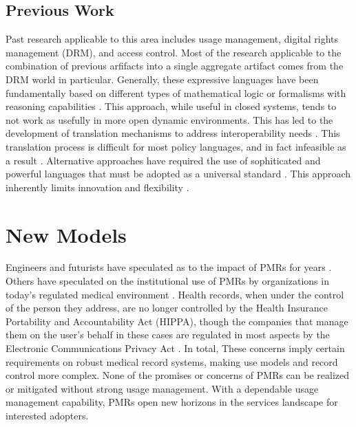 \documentclass[10pt, conference, compsocconf]{IEEEtran}
\begin{document}
\subsection{Previous Work}
Past research applicable to this area includes usage management, digital rights management (DRM), and access control.  Most of the research applicable to the combination of previous arfifacts into a single aggregate artifact comes from the DRM world in particular.  Generally, these expressive languages have been fundamentally based on different types of mathematical logic or formalisms with reasoning capabilities \cite{ArHu:07,BaMi:06,ChCoEtHaJoLa:03,HaWe:04,HaWe:08,PuWe:02,XiBjFu:08}.  This approach, while useful in closed systems, tends to not work as usefully in more open dynamic environments.  This has led to the development of translation mechanisms to address interoperability needs \cite{HeJa:05,PoPrDe:04,ScTaWo:04}.  This translation process is difficult for most policy languages, and in fact infeasible as a result \cite{KoLaMaMi:04,SaShUe:04}.  Alternative approaches have required the use of sophiticated and powerful languages that must be adopted as a universal standard \cite{OMADRM,ODRL-req,Wa:04,XrML-spec}.  This approach inherently limits innovation and flexibility \cite{HeJa:05,JaHe:04,JaHe:08,JaHeMa:06}.

\section{New Models}
Engineers and futurists have speculated as to the impact of PMRs for years \cite{Emr:Web:BestCaseEMR,Emr:Web:WorstCaseEMR}.  Others have speculated on the institutional use of PMRs by organizations in today's regulated medical environment \cite{Emr:doi:10.1056/NEJMc081118}.  Health records, when under the control of the person they address, are no longer controlled by the Health Insurance Portability and Accountability Act (HIPPA), though the companies that manage them on the user's behalf in these cases are regulated in most aspects by the Electronic Communications Privacy Act \cite{Emr:doi:10.1056/NEJMsb0800220}.  In total, These concerns imply certain requirements on robust medical record systems, making use models and record control more complex.  None of the promises or concerns of PMRs can be realized or mitigated without strong usage management.  With a dependable usage management capability, PMRs open new horizons in the services landscape for interested adopters.
\end{document}
